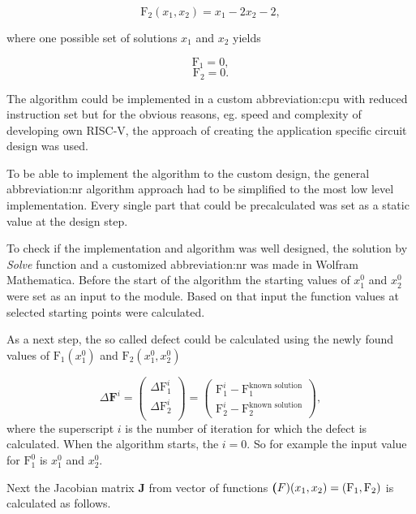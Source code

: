 \documentclass[a4paper, twoside, 11pt]{article}
\begin{document}
        \begin{equation}
            \text{F}_2 (x_1, x_2) = x_1 - 2 x_2 - 2, 
        \end{equation}

        where one possible set of solutions $x_1$ and $x_2$ yields

        \begin{equation}
            \text{F}_1 = 0, 
        \end{equation}
        \begin{equation}
            \text{F}_2 = 0.
        \end{equation}

        \par
        The algorithm could be implemented in a custom \gls{abbreviation:cpu} with reduced instruction set but for the obvious reasons, eg. speed and complexity of developing own RISC-V, the approach of creating the application specific circuit design was used.\par
        To be able to implement the algorithm to the custom design, the general \gls{abbreviation:nr} algorithm approach had to be simplified to the most low level implementation. Every single part that could be precalculated was set as a static value at the design step.\par
        To check if the implementation and algorithm was well designed, the solution by \textit{Solve} function and a customized \gls{abbreviation:nr} was made in Wolfram Mathematica. Before the start of the algorithm the starting values of $x_1^0$ and $x_2^0$ were set as an input to the module. Based on that input the function values at selected starting points were calculated.\par
        As a next step, the so called defect could be calculated using the newly found values of $\text{F}_1 (x_1^0)$ and $\text{F}_2 (x_1^0, x_2^0)$

        \begin{equation}
            \Delta \textbf{F}^i =
            \begin{pmatrix}
                \Delta \text{F}_1^i\\
                \Delta \text{F}_2^i\\
            \end{pmatrix}
            =
            \begin{pmatrix}
                \text{F}_1^i - \text{F}_1^{\text{known solution}}\\
                \text{F}_2^i - \text{F}_2^{\text{known solution}}
            \end{pmatrix},
        \end{equation}
        where the superscript $i$ is the number of iteration for which the defect is calculated. When the algorithm starts, the $i = 0$. So for example the input value for $\text{F}_1^0$ is $x_1^0$ and $x_2^0$.\par
        Next the Jacobian matrix \textbf{J} from vector of functions $\textbf(F)(x_1, x_2) = (\text{F}_1, \text{F}_2)$ is calculated as follows.
\end{document}
